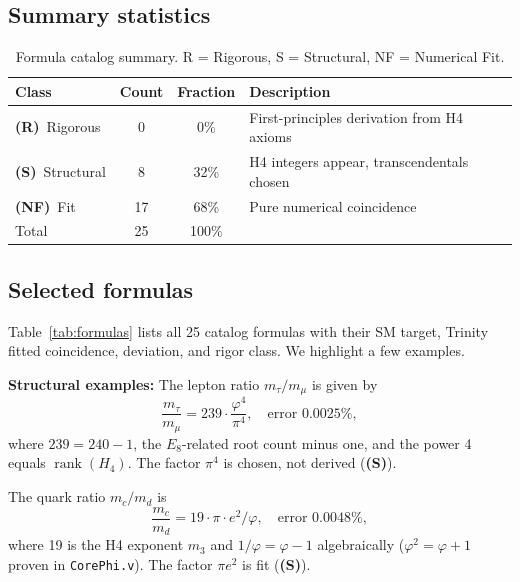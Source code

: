 \documentclass[12pt,a4paper]{article}
\newcommand{\Rclass}{\textbf{(R)}}
\newcommand{\Sclass}{\textbf{(S)}}
\newcommand{\NFclass}{\textbf{(NF)}}
\begin{document}
\subsection{Summary statistics}

\begin{table}[htbp]
  \centering
  \caption{Formula catalog summary. R = Rigorous, S = Structural, NF = Numerical Fit.}
  \label{tab:catalog_summary}
  \begin{tabular}{lccp{8cm}}
    \toprule
    Class & Count & Fraction & Description \\
    \midrule
    \Rclass~Rigorous   & 0  & 0\%  & First-principles derivation from H4 axioms \\
    \Sclass~Structural & 8  & 32\% & H4 integers appear, transcendentals chosen \\
    \NFclass~Fit       & 17 & 68\% & Pure numerical coincidence \\
    \midrule
    Total & 25 & 100\% & \\
    \bottomrule
  \end{tabular}
\end{table}

\subsection{Selected formulas}

Table~\ref{tab:formulas} lists all 25 catalog formulas with their SM target, Trinity fitted coincidence,
deviation, and rigor class. We highlight a few examples.

\textbf{Structural examples:}
The lepton ratio \(m_\tau/m_\mu\) is given by
\begin{equation}
  \frac{m_\tau}{m_\mu} = 239 \cdot \frac{\varphi^4}{\pi^4},
  \quad \text{error } 0.0025\%,
  \label{eq:L02}
\end{equation}
where \(239 = 240 - 1\), the \(E_8\)-related root count minus one, and the power 4 equals
\(\operatorname{rank}(H_4)\). The factor \(\pi^4\) is chosen, not derived (\Sclass).

The quark ratio \(m_c/m_d\) is
\begin{equation}
  \frac{m_c}{m_d} = 19 \cdot \pi \cdot e^2 / \varphi,
  \quad \text{error } 0.0048\%,
  \label{eq:Q03}
\end{equation}
where 19 is the H4 exponent \(m_3\) and \(1/\varphi = \varphi - 1\) algebraically
(\(\varphi^2 = \varphi + 1\) proven in \texttt{CorePhi.v}). The factor \(\pi e^2\) is fit (\Sclass).
\end{document}
